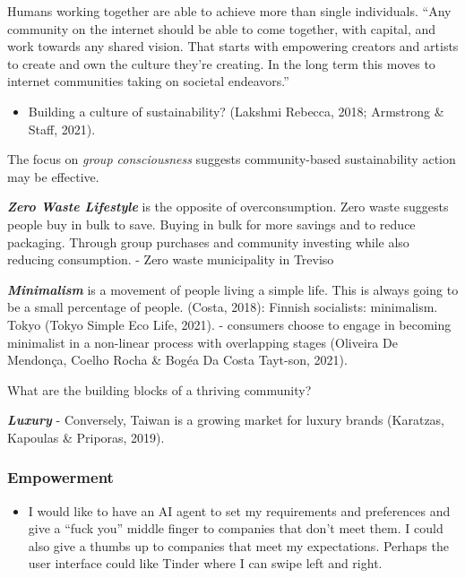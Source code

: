 \documentclass[
  letterpaper,
  DIV=11,
  numbers=noendperiod]{scrartcl}
\providecommand{\tightlist}{%
  \setlength{\itemsep}{0pt}\setlength{\parskip}{0pt}}\usepackage{longtable,booktabs,array}
\begin{document}
Humans working together are able to achieve more than single
individuals. ``Any community on the internet should be able to come
together, with capital, and work towards any shared vision. That starts
with empowering creators and artists to create and own the culture
they're creating. In the long term this moves to internet communities
taking on societal endeavors.''

\begin{itemize}
\tightlist
\item
  Building a culture of sustainability? (Lakshmi Rebecca, 2018;
  Armstrong \& Staff, 2021).
\end{itemize}

The focus on \emph{group consciousness} suggests community-based
sustainability action may be effective.

\textbf{\emph{Zero Waste Lifestyle}} is the opposite of overconsumption.
Zero waste suggests people buy in bulk to save. Buying in bulk for more
savings and to reduce packaging. Through group purchases and community
investing while also reducing consumption. - Zero waste municipality in
Treviso

\textbf{\emph{Minimalism}} is a movement of people living a simple life.
This is always going to be a small percentage of people. (Costa, 2018):
Finnish socialists: minimalism. Tokyo (Tokyo Simple Eco Life, 2021). -
consumers choose to engage in becoming minimalist in a non-linear
process with overlapping stages (Oliveira De Mendonça, Coelho Rocha \&
Bogéa Da Costa Tayt-son, 2021).

What are the building blocks of a thriving community?

\textbf{\emph{Luxury}} - Conversely, Taiwan is a growing market for
luxury brands (Karatzas, Kapoulas \& Priporas, 2019).

\subsubsection{Empowerment}\label{empowerment}

\begin{itemize}
\tightlist
\item
  I would like to have an AI agent to set my requirements and
  preferences and give a ``fuck you'' middle finger to companies that
  don't meet them. I could also give a thumbs up to companies that meet
  my expectations. Perhaps the user interface could like Tinder where I
  can swipe left and right.
\end{itemize}
\end{document}
